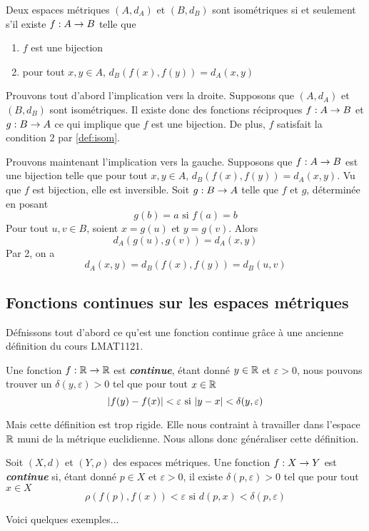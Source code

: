 \documentclass[french]{article}
\begin{document}
\begin{theoreme}
  Deux espaces métriques $(A, d_A)$ et $(B, d_B)$ sont isométriques si et seulement s'il existe $f: A \rightarrow B$ telle que
  \begin{enumerate}
    \item $f$ est une bijection
    \item pour tout $x, y \in A$, $d_B(f(x), f(y)) = d_A(x, y)$
  \end{enumerate}

  \tcblower
  \begin{preuve}
    Prouvons tout d'abord l'implication vers la droite. Supposons que $(A, d_A)$ et $(B, d_B)$ sont isométriques. Il existe donc des fonctions réciproques $f: A \rightarrow B$ et $g: B \rightarrow A$ ce qui implique que $f$ est une bijection. De plus, $f$ satisfait la condition $2$ par \eqref{def:isom}.
    \par Prouvons maintenant l'implication vers la gauche. Supposons que $f: A \rightarrow B$ est une bijection telle que pour tout $x, y \in A$, $d_B(f(x), f(y)) = d_A(x, y)$. Vu que $f$ est bijection, elle est inversible. Soit $g: B \rightarrow A$ telle que $f$ et $g$, déterminée en posant $$g(b) = a \text{ si  } f(a) = b$$ Pour tout $u, v \in B$, soient $x = g(u)$ et $y = g(v)$. Alors $$d_A(g(u), g(v)) = d_A(x, y)$$
    Par 2, on a $$d_A(x, y) = d_B(f(x), f(y)) = d_B(u, v)$$
  \end{preuve}
\end{theoreme}

\subsection{Fonctions continues sur les espaces métriques}

Défnissons tout d'abord ce qu'est une fonction continue grâce à une ancienne définition du cours LMAT1121.
\begin{definition}[Ancienne]
  Une fonction $f: \mathbb{R} \rightarrow \mathbb{R}$ est \textbf{\it continue}, étant donné $y \in \mathbb{R}$ et $\varepsilon > 0$, nous pouvons trouver un $\delta(y, \varepsilon) > 0$ tel que pour tout $x \in \mathbb{R}$
  $$\lvert f(y) - f(x)\rvert < \varepsilon \text{ si } \lvert y - x\rvert < \delta(y, \varepsilon)$$
\end{definition}
Mais cette définition est trop rigide. Elle nous contraint à travailler dans l'espace $\mathbb{R}$ muni de la métrique euclidienne. Nous allons donc généraliser cette définition.

\begin{definition}[Nouvelle]
  Soit $(X, d)$ et $(Y, \rho)$ des espaces métriques. Une fonction $f: X \rightarrow Y$ est \textbf{\it continue} si, étant donné $p \in X$ et $\varepsilon > 0$, il existe $\delta(p, \varepsilon) > 0$ tel que pour tout $x \in X$
  $$\rho(f(p), f(x)) < \varepsilon \text{ si } d(p, x) < \delta(p, \varepsilon)$$
\end{definition}
Voici quelques exemples...
\end{document}
